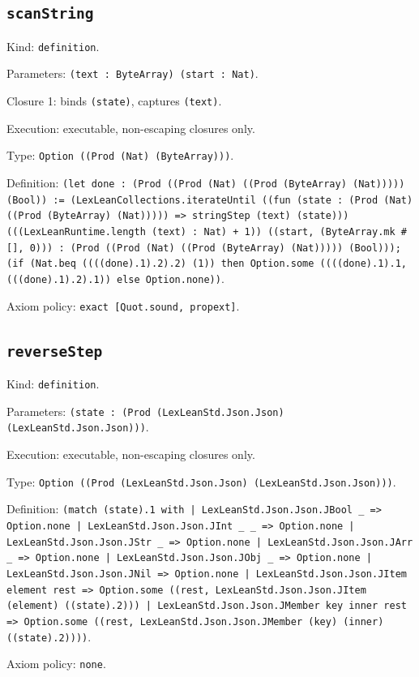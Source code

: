 \documentclass[11pt]{article}
\begin{document}
\subsection*{\texttt{scanString}}
\noindent Kind: \texttt{definition}.\par
\noindent Parameters: \texttt{(text : ByteArray) (start : Nat)}.\par
\noindent Closure 1: binds \texttt{(state)}, captures \texttt{(text)}.\par
\noindent Execution: executable, non-escaping closures only.\par
\noindent Type: \texttt{Option ((Prod (Nat) (ByteArray)))}.\par
\noindent Definition: \texttt{(let done : (Prod ((Prod (Nat) ((Prod (ByteArray) (Nat))))) (Bool)) := (LexLeanCollections.iterateUntil ((fun (state : (Prod (Nat) ((Prod (ByteArray) (Nat))))) => stringStep (text) (state))) (((LexLeanRuntime.length (text) : Nat) + 1)) ((start, (ByteArray.mk \#[], 0))) : (Prod ((Prod (Nat) ((Prod (ByteArray) (Nat))))) (Bool))); (if (Nat.beq ((((done).1).2).2) (1)) then Option.some ((((done).1).1, (((done).1).2).1)) else Option.none))}.\par
\noindent Axiom policy: \texttt{exact [Quot.sound, propext]}.\par
\subsection*{\texttt{reverseStep}}
\noindent Kind: \texttt{definition}.\par
\noindent Parameters: \texttt{(state : (Prod (LexLeanStd.Json.Json) (LexLeanStd.Json.Json)))}.\par
\noindent Execution: executable, non-escaping closures only.\par
\noindent Type: \texttt{Option ((Prod (LexLeanStd.Json.Json) (LexLeanStd.Json.Json)))}.\par
\noindent Definition: \texttt{(match (state).1 with | LexLeanStd.Json.Json.JBool \_ => Option.none | LexLeanStd.Json.Json.JInt \_ \_ => Option.none | LexLeanStd.Json.Json.JStr \_ => Option.none | LexLeanStd.Json.Json.JArr \_ => Option.none | LexLeanStd.Json.Json.JObj \_ => Option.none | LexLeanStd.Json.Json.JNil => Option.none | LexLeanStd.Json.Json.JItem element rest => Option.some ((rest, LexLeanStd.Json.Json.JItem (element) ((state).2))) | LexLeanStd.Json.Json.JMember key inner rest => Option.some ((rest, LexLeanStd.Json.Json.JMember (key) (inner) ((state).2))))}.\par
\noindent Axiom policy: \texttt{none}.\par
\end{document}
